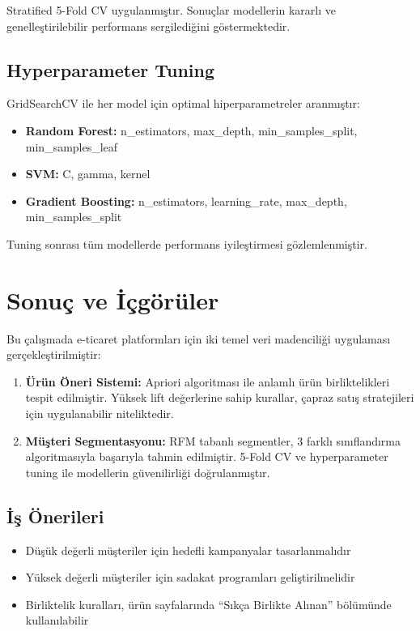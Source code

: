 \documentclass[conference]{IEEEtran}
\begin{document}
Stratified 5-Fold CV uygulanmıştır. Sonuçlar modellerin kararlı ve genelleştirilebilir performans sergilediğini göstermektedir.

\subsection{Hyperparameter Tuning}

GridSearchCV ile her model için optimal hiperparametreler aranmıştır:

\begin{itemize}[leftmargin=*]
    \item \textbf{Random Forest:} n\_estimators, max\_depth, min\_samples\_split, min\_samples\_leaf
    \item \textbf{SVM:} C, gamma, kernel
    \item \textbf{Gradient Boosting:} n\_estimators, learning\_rate, max\_depth, min\_samples\_split
\end{itemize}

Tuning sonrası tüm modellerde performans iyileştirmesi gözlemlenmiştir.

\section{Sonuç ve İçgörüler}

Bu çalışmada e-ticaret platformları için iki temel veri madenciliği uygulaması gerçekleştirilmiştir:

\begin{enumerate}[leftmargin=*]
    \item \textbf{Ürün Öneri Sistemi:} Apriori algoritması ile anlamlı ürün birliktelikleri tespit edilmiştir. Yüksek lift değerlerine sahip kurallar, çapraz satış stratejileri için uygulanabilir niteliktedir.

    \item \textbf{Müşteri Segmentasyonu:} RFM tabanlı segmentler, 3 farklı sınıflandırma algoritmasıyla başarıyla tahmin edilmiştir. 5-Fold CV ve hyperparameter tuning ile modellerin güvenilirliği doğrulanmıştır.
\end{enumerate}

\subsection{İş Önerileri}
\begin{itemize}[leftmargin=*]
    \item Düşük değerli müşteriler için hedefli kampanyalar tasarlanmalıdır
    \item Yüksek değerli müşteriler için sadakat programları geliştirilmelidir
    \item Birliktelik kuralları, ürün sayfalarında ``Sıkça Birlikte Alınan'' bölümünde kullanılabilir
\end{itemize}
\end{document}
